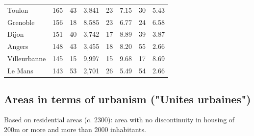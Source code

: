 \documentclass[11pt]{article}
\begin{document}
\begin{table}[H]
\begin{tabular}{llrrrrrr}
        Toulon &        165 &         43 &        3,841 &         23 &       7.15 &         30 &        5.43 \\
      Grenoble &        156 &         18 &        8,585 &         23 &       6.77 &         24 &        6.58 \\
         Dijon &        151 &         40 &        3,742 &         17 &       8.89 &         39 &        3.87 \\
        Angers &        148 &         43 &        3,455 &         18 &       8.20 &         55 &        2.66 \\
  Villeurbanne &        145 &         15 &        9,997 &         15 &       9.68 &         17 &        8.69 \\
       Le Mans &        143 &         53 &        2,701 &         26 &       5.49 &         54 &        2.66 \\
\bottomrule
\end{tabular}

\end{table}

\subsection{Areas in terms of urbanism ("Unites urbaines")}

Based on residential areas (c. 2300): area with no discontinuity in housing of 200m or more and more than 2000 inhabitants.
\end{document}
